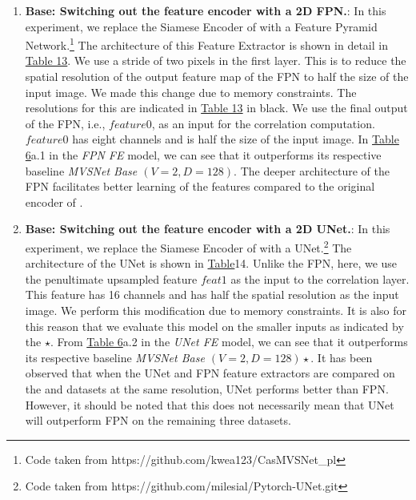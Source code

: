 \begin{enumerate}
    \item \textbf{{\mvsn} Base: Switching out the {\mvsn} feature encoder with a 2D FPN.}: In this experiment, we replace the Siamese Encoder of {\mvsn} with a Feature Pyramid Network.\footnote{Code taken from https://github.com/kwea123/CasMVSNet\_pl} The architecture of this Feature Extractor is shown in detail in \hyperref[tab:arch-fpn]{Table 13}. We use a stride of two pixels in the first layer. This is to reduce the spatial resolution of the output feature map of the FPN to half the size of the input image. We made this change due to memory constraints. The resolutions for this are indicated in \hyperref[tab:arch-fpn]{Table 13} in black. We use the final output of the FPN, i.e., $feature0$, as an input for the correlation computation. $feature0$ has eight channels and is half the size of the input image. In \hyperref[tab:feat-enc]{Table 6}{a.1} in the \textit{FPN FE} model, we can see that it outperforms its respective baseline \textit{MVSNet Base $(V=2, D=128)$}. The deeper architecture of the FPN facilitates better learning of the features compared to the original encoder of {\mvsn}.

    \item \textbf{{\mvsn} Base: Switching out the {\mvsn} feature encoder with a 2D UNet.}: In this experiment, we replace the Siamese Encoder of {\mvsn} with a UNet.\footnote{Code taken from https://github.com/milesial/Pytorch-UNet.git} The architecture of the UNet is shown in \hyperref[tab:arch-unet]{Table}{14}. Unlike the FPN, here, we use the penultimate upsampled feature $feat1$ as the input to the correlation layer. This feature has 16 channels and has half the spatial resolution as the input image. We perform this modification due to memory constraints. It is also for this reason that we evaluate this model on the smaller inputs as indicated by the \(\star\). From \hyperref[tab:feat-enc]{Table 6}{a.2} in the \textit{UNet FE} model, we can see that it outperforms its respective baseline \textit{MVSNet Base $(V=2, D=128) \star$}. It has been observed that when the UNet and FPN feature extractors are compared on the {\kitti} and {\scannet} datasets at the same resolution, UNet performs better than FPN. However, it should be noted that this does not necessarily mean that UNet will outperform FPN on the remaining three datasets.



\end{enumerate}
